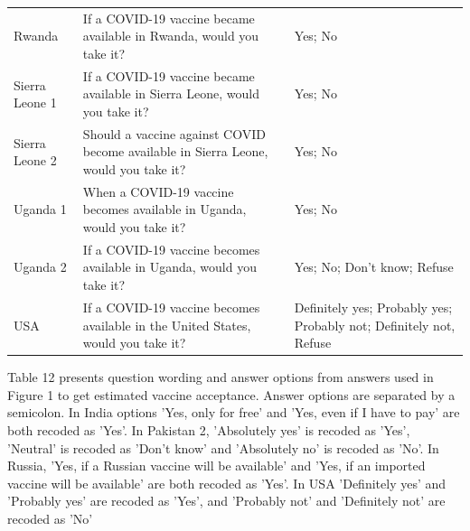 \documentclass[
  12pt,
]{article}
\begin{document}
\begin{table}[!h]
{\begin{threeparttable}
\begin{tabular}[t]{>{\raggedright\arraybackslash}p{8em}>{\raggedright\arraybackslash}p{30em}>{\raggedright\arraybackslash}p{20em}}
Rwanda & If a COVID-19 vaccine became available in Rwanda, would you take it? & Yes; No\\
Sierra Leone 1 & If a COVID-19 vaccine became available in Sierra Leone, would you take it? & Yes; No\\
Sierra Leone 2 & Should a vaccine against COVID become available in Sierra Leone, would you take it? & Yes; No\\
Uganda 1 & When a COVID-19 vaccine becomes available in Uganda, would you take it? & Yes; No\\
Uganda 2 & If a COVID-19 vaccine becomes available in Uganda, would you take it? & Yes; No; Don't know; Refuse\\
USA & If a COVID-19 vaccine becomes available in the United States, would you take it? & Definitely yes; Probably yes; Probably not; Definitely not, Refuse\\
\bottomrule
\end{tabular}
\begin{tablenotes}
\item Table 12 presents question wording and answer options from answers used in Figure 1 to get estimated vaccine acceptance. Answer options are separated by a semicolon. In India options 'Yes, only for free' and 'Yes, even if I have to pay' are both recoded as 'Yes'. In Pakistan 2, 'Absolutely yes' is recoded as 'Yes', 'Neutral' is recoded as 'Don't know' and 'Absolutely no' is recoded as 'No'. In Russia, 'Yes, if a Russian vaccine will be available' and 'Yes, if an imported vaccine will be available' are both recoded as 'Yes'. In USA 'Definitely yes' and 'Probably yes' are recoded as 'Yes', and 'Probably not' and 'Definitely not' are recoded as 'No'
\end{tablenotes}
\end{threeparttable}}
\end{table}
\end{document}
